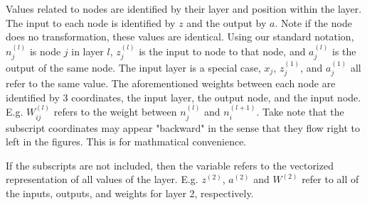 \documentclass[]{article}
\begin{document}

Values related to nodes are identified by their layer and position within the layer. The input to each node is identified by $z$ and the output by $a$. Note if the node does no transformation, these values are identical. Using our standard notation, $n^{(l)}_j$ is node $j$ in layer $l$, $z^{(l)}_j$ is the input to node to that node, and $a^{(l)}_j$ is the output of the same node. The input layer is a special case, $x_j$, $z^{(1)}_j$, and $a^{(1)}_j$ all refer to the same value. The aforementioned weights between each node are identified by 3 coordinates, the input layer, the output node, and the input node. E.g. $W^{(l)}_{ij}$ refers to the weight between $n^{(l)}_j$ and $n^{(l+1)}_i$. Take note that the subscript coordinates may appear "backward" in the sense that they flow right to left in the figures. This is for mathmatical convenience.

If the subscripts are not included, then the variable refers to the vectorized representation of all values of the layer. E.g. $z^{(2)}$, $a^{(2)}$ and $W^{(2)}$ refer to all of the inputs, outputs, and weights for layer 2, respectively.
\end{document}
